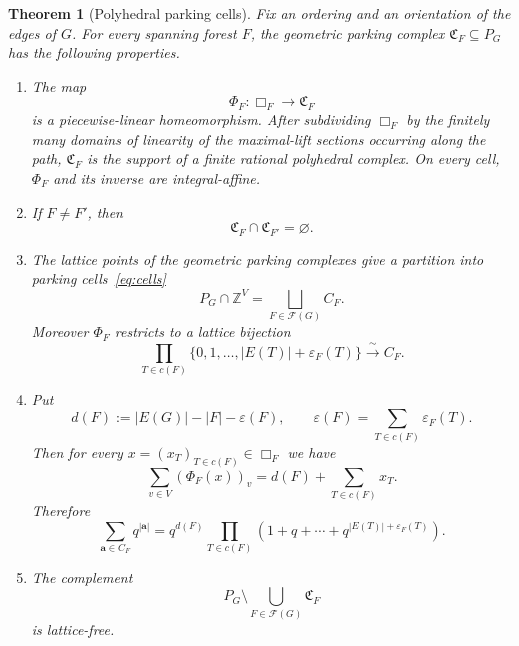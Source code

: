 \documentclass[11pt]{article}
\theoremstyle{plain}
\newtheorem{theorem}{Theorem}[section]
\theoremstyle{definition}
\renewcommand{\mathcal}{\mathscr}
\newcommand{\cF}{\mathcal{F}}    %
\newcommand{\fC}{\mathfrak C}    %
\newcommand{\ba}{\mathbf{a}}
\newcommand{\eps}{\varepsilon}
\newcommand{\ZZ}{\mathbb Z}
\numberwithin{equation}{section}
\begin{document}
\begin{theorem}
  [Polyhedral parking cells]
  \label{thm:polyhedral-parking-cells} Fix an ordering and an orientation of the edges of $G$.
For every spanning
forest $F$, the geometric parking complex $\fC_F\subseteq P_G$ has the following properties.
\begin{enumerate}
\item[(i)] The map
\[
   \Phi_F:\Box_F\longrightarrow\fC_F
\]
is a piecewise-linear homeomorphism.  After subdividing $\Box_F$ by
the finitely many domains of linearity of the maximal-lift sections occurring  along the path,
$\fC_F$ is the support of a finite rational polyhedral complex.
On every cell, $\Phi_F$ and its inverse are integral-affine.

\item[(ii)] If $F\ne F'$, then
\begin{equation}
   \fC_F\cap\fC_{F'}=\varnothing.
\label{eq:geometric-cells-disjoint}
\end{equation}

\item[(iii)] The lattice points of the geometric parking complexes give a partition into parking cells~\eqref{eq:cells}
\begin{equation}
   P_G\cap\ZZ^V
   =\bigsqcup_{F\in\cF(G)}C_F.
\label{eq:parking-lattice-partition}
\end{equation}
Moreover $\Phi_F$ restricts to a lattice bijection
\begin{equation}
   \prod_{T\in c(F)}
      \{0,1,\ldots,|E(T)|+\eps_F(T)\}
   \xrightarrow{\ \sim\ } C_F.
\label{eq:parking-chain-product}
\end{equation}

\item[(iv)] Put
\begin{equation}
   d(F):=|E(G)|-|F|-\eps(F),
   \qquad
   \eps(F)=\sum_{T\in c(F)}\eps_F(T).
\label{eq:parking-shift}
\end{equation}
Then for every $x=(x_T)_{T\in c(F)}\in\Box_F$ we have
\begin{equation}
   \sum_{v\in V}(\Phi_F(x))_v  = d(F)+\sum_{T\in c(F)}x_T.
\label{eq:parking-grading}
\end{equation}
Therefore
\begin{equation}
 \sum_{\ba\in C_F}q^{|\ba|} = q^{d(F)} \prod_{T\in c(F)}\left(1+q+\cdots+ q^{|E(T)|+\eps_F(T)}\right).
\label{eq:parking-cell-enumerator}
\end{equation}

\item[(v)] The complement
\begin{equation}
   P_G\setminus\bigcup_{F\in\cF(G)}\fC_F
\label{eq:lattice-free-complement}
\end{equation}
is lattice-free.
\end{enumerate}
\end{theorem}
\end{document}
